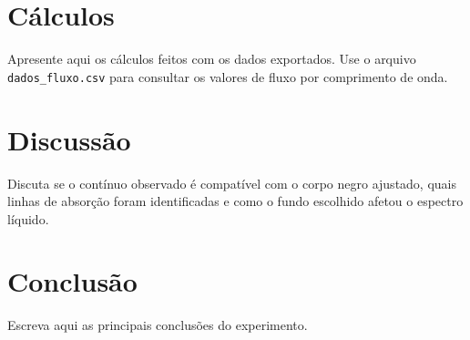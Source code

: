 \documentclass[12pt,a4paper]{article}
\begin{document}
% 
% 

\section{Cálculos}

Apresente aqui os cálculos feitos com os dados exportados. Use o arquivo \texttt{dados\_fluxo.csv} para consultar os valores de fluxo por comprimento de onda.

\section{Discussão}

Discuta se o contínuo observado é compatível com o corpo negro ajustado, quais linhas de absorção foram identificadas e como o fundo escolhido afetou o espectro líquido.

\section{Conclusão}

Escreva aqui as principais conclusões do experimento.
\end{document}
